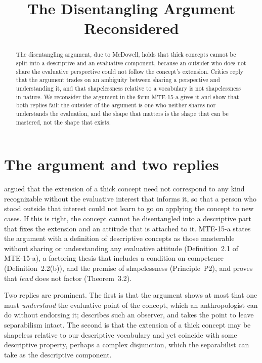 \documentclass{situationist-preprint}
\title{The Disentangling Argument Reconsidered}
\begin{document}
\maketitle

\begin{abstract}
The disentangling argument, due to McDowell, holds that thick concepts cannot be split into a descriptive and an evaluative component, because an outsider who does not share the evaluative perspective could not follow the concept's extension. Critics reply that the argument trades on an ambiguity between sharing a perspective and understanding it, and that shapelessness relative to a vocabulary is not shapelessness in nature. We reconsider the argument in the form MTE-15-a gives it and show that both replies fail: the outsider of the argument is one who neither shares nor understands the evaluation, and the shape that matters is the shape that can be mastered, not the shape that exists.
\end{abstract}

\section{The argument and two replies}

\citet{McDowell1981} argued that the extension of a thick concept need not correspond to any kind recognizable without the evaluative interest that informs it, so that a person who stood outside that interest could not learn to go on applying the concept to new cases. If this is right, the concept cannot be disentangled into a descriptive part that fixes the extension and an attitude that is attached to it. MTE-15-a states the argument with a definition of descriptive concepts as those masterable without sharing or understanding any evaluative attitude (Definition~2.1 of MTE-15-a), a factoring thesis that includes a condition on competence (Definition~2.2(b)), and the premise of shapelessness (Principle~P2), and proves that \emph{lewd} does not factor (Theorem~3.2).

Two replies are prominent. The first is that the argument shows at most that one must \emph{understand} the evaluative point of the concept, which an anthropologist can do without endorsing it; \citet{Williams1985} describes such an observer, and \citet{Blackburn1992} takes the point to leave separabilism intact. The second is that the extension of a thick concept may be shapeless relative to our descriptive vocabulary and yet coincide with some descriptive property, perhaps a complex disjunction, which the separabilist can take as the descriptive component.
\end{document}
